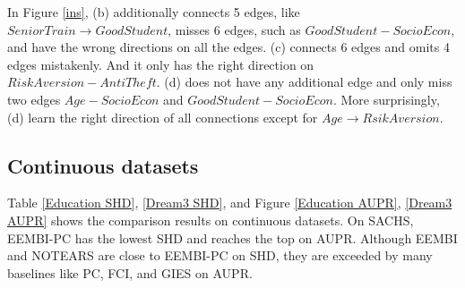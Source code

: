\documentclass[twoside,11pt]{article}
\begin{document}
\begin{figure*}[htbp]
\centering



\caption{Parts of the CPDAG structure of INSURANCE dataset. (a) is the true CPDAG of CHILD dataset. (b) (c) (d) are the CPDAGs learned from PC, CDNOD, and EEMBI-PC algorithms}\label{ins}
\end{figure*}


In Figure \ref{ins}, (b) additionally connects 5 edges, like $SeniorTrain\to GoodStudent$, misses 6 edges, such as $GoodStudent- SocioEcon$, and have the wrong directions on all the edges. (c) connects 6 edges and omits 4 edges mistakenly. And it only has the right direction on $RiskAversion-AntiTheft$. (d) does not have any additional edge and only miss two edges $Age- SocioEcon$ and $GoodStudent-SocioEcon$. More surprisingly, (d) learn the right direction of all connections except for $Age\to RsikAversion$. 









\subsection{Continuous datasets}
Table \ref{Education SHD}, \ref{Dream3 SHD}, and Figure \ref{Education AUPR}, \ref{Dream3 AUPR} shows the comparison results on continuous datasets. On SACHS, EEMBI-PC has the lowest SHD and reaches the top on AUPR. Although EEMBI and NOTEARS are close to EEMBI-PC on SHD, they are exceeded by many baselines like PC, FCI, and GIES on AUPR.
\end{document}
